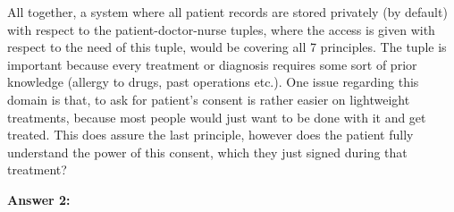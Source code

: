 \documentclass[12pt,reqno]{amsart}
\begin{document}
All together, a system where all patient records are stored privately (by default) with respect to the patient-doctor-nurse tuples, where the access is given with respect to the need of this tuple, would be covering all 7 principles. The tuple is important because every treatment or diagnosis requires some sort of prior knowledge (allergy to drugs, past operations etc.). One issue regarding this domain is that, to ask for patient's consent is rather easier on lightweight treatments, because most people would just want to be done with it and get treated. This does assure the last principle, however does the patient fully understand the power of this consent, which they just signed during that treatment?

\vspace{20px}

\textbf{Answer 2:} 
\end{document}
